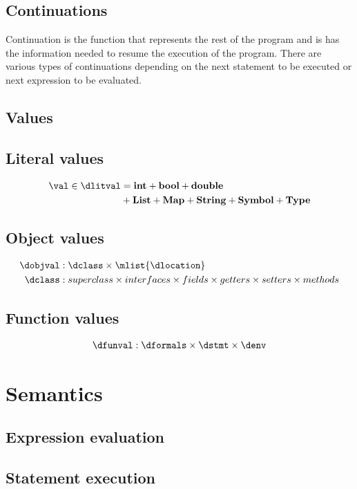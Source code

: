 \documentclass{article}
\begin{document}
\subsection{Continuations}
\label{subsec:continuations-defiontion}

Continuation is the function that represents the rest of the program and is has the information needed to resume the execution of the program. 
There are various types of continuations depending on the next statement to be executed or next expression to be evaluated.

\subsection{Values}
\label{subsec:values}
\subsection{Literal values}
\label{subsubsec:literal-values}
\begin{align*}
\val \in \dlitval &= \mathbf{int} + \mathbf{bool} + \mathbf{double} \\ &+ \mathbf{List} + \mathbf{Map} + \mathbf{String} + \mathbf{Symbol} + \mathbf{Type} 
\end{align*} 
\subsection{Object values}
\label{subsec:object-values}
\begin{align*}
 \dobjval &: \dclass \times \mlist{\dlocation}\\
 \dclass &: superclass \times interfaces \times fields \times getters \times setters \times methods
\end{align*}

\subsection{Function values}
\label{subsec:function-values}
\begin{align*}
\dfunval : \dformals \times \dstmt \times \denv 
\end{align*}

\section{Semantics}
\label{sec:semantics}
\subsection{Expression evaluation}
\label{subsec:expr-evaluation}

\subsection{Statement execution}
\label{subsec:stmt-exectution}
\end{document}
